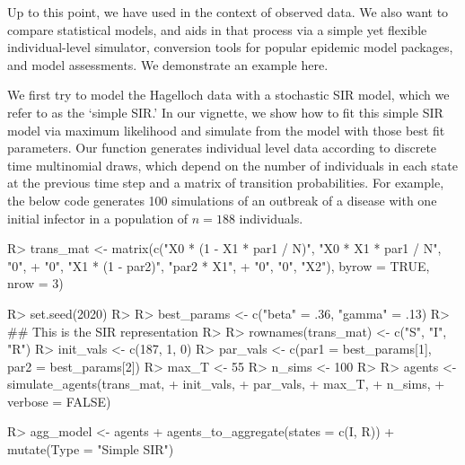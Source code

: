 \documentclass[
  shortnames]{jss}
\begin{document}
Up to this point, we have used  in the context of
observed data. We also want to compare statistical models, and
 aids in that process via a simple yet flexible
individual-level simulator, conversion tools for popular epidemic model
packages, and model assessments. We demonstrate an example here.

We first try to model the Hagelloch data with a stochastic SIR model,
which we refer to as the `simple SIR.' In our vignette, we show how to
fit this simple SIR model via maximum likelihood and simulate from the
model with those best fit parameters. Our function
 generates individual level data according to
discrete time multinomial draws, which depend on the number of
individuals in each state at the previous time step and a matrix of
transition probabilities. For example, the below code generates 100
simulations of an outbreak of a disease with one initial infector in a
population of \(n= 188\) individuals.

\begin{CodeChunk}
\begin{CodeInput}
R> trans_mat <- matrix(c("X0 * (1 - X1 * par1 / N)", "X0 * X1  * par1 / N", "0",
+                   "0", "X1 * (1 - par2)", "par2 * X1",
+                   "0", "0", "X2"), byrow = TRUE, nrow = 3)
\end{CodeInput}
\end{CodeChunk}

\begin{CodeChunk}
\begin{CodeInput}
R> set.seed(2020)
R> 
R> best_params <- c("beta" = .36, "gamma" = .13)
R> ## This is the SIR representation
R> 
R> rownames(trans_mat) <- c("S", "I", "R")
R> init_vals <- c(187, 1, 0)
R> par_vals <- c(par1 = best_params[1], par2 = best_params[2])
R> max_T <- 55
R> n_sims <- 100
R> 
R> agents <- simulate_agents(trans_mat,
+                        init_vals,
+                        par_vals,
+                        max_T,
+                        n_sims,
+                        verbose = FALSE)
\end{CodeInput}
\end{CodeChunk}

\begin{CodeChunk}
\begin{CodeInput}
R> agg_model <- agents %
+   agents_to_aggregate(states = c(I, R)) %
+   mutate(Type = "Simple SIR")
\end{CodeInput}
\end{CodeChunk}
\end{document}
